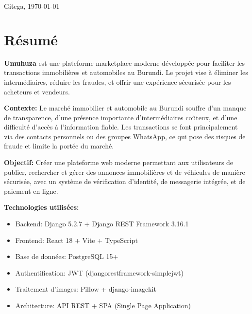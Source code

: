 \documentclass[12pt,a4paper]{report}
\begin{document}
\begin{titlepage}
\begin{center}
        \vspace{1cm}

        {\large Gitega, \today}

    \end{center}
\end{titlepage}

\chapter*{Résumé}

\textbf{Umuhuza} est une plateforme marketplace moderne développée pour faciliter les transactions immobilières et automobiles au Burundi. Le projet vise à éliminer les intermédiaires, réduire les fraudes, et offrir une expérience sécurisée pour les acheteurs et vendeurs.

\vspace{0.5cm}

\textbf{Contexte:} Le marché immobilier et automobile au Burundi souffre d'un manque de transparence, d'une présence importante d'intermédiaires coûteux, et d'une difficulté d'accès à l'information fiable. Les transactions se font principalement via des contacts personnels ou des groupes WhatsApp, ce qui pose des risques de fraude et limite la portée du marché.

\vspace{0.5cm}

\textbf{Objectif:} Créer une plateforme web moderne permettant aux utilisateurs de publier, rechercher et gérer des annonces immobilières et de véhicules de manière sécurisée, avec un système de vérification d'identité, de messagerie intégrée, et de paiement en ligne.

\vspace{0.5cm}

\textbf{Technologies utilisées:}
\begin{itemize}[noitemsep]
    \item Backend: Django 5.2.7 + Django REST Framework 3.16.1
    \item Frontend: React 18 + Vite + TypeScript
    \item Base de données: PostgreSQL 15+
    \item Authentification: JWT (djangorestframework-simplejwt)
    \item Traitement d'images: Pillow + django-imagekit
    \item Architecture: API REST + SPA (Single Page Application)
\end{itemize}
\end{document}

